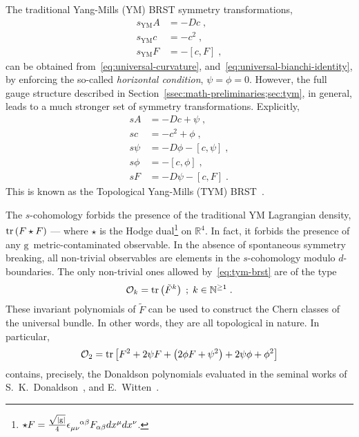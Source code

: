 \documentclass[../main/tex]{subfiles}
\begin{document}
The traditional Yang-Mills (YM) BRST symmetry transformations,
\begin{subequations}\label{eq:ym-brst}
  \begin{align}
    s_{\text{YM}}A & = -Dc \;,                   \\
    s_{\text{YM}}c & = - c^2 \;,                 \\
    s_{\text{YM}}F & = - \left[ c, F \right] \;,
  \end{align}
\end{subequations}
can be obtained from~\eqref{eq:universal-curvature}, and~\eqref{eq:universal-bianchi-identity}, by enforcing the so-called \emph{horizontal condition}, $\psi=\phi=0$. However, the full gauge structure described in Section~\ref{ssec:math-preliminaries;sec:tym}, in general, leads to a much stronger set of symmetry transformations. Explicitly,
\begin{subequations}\label{eq:tym-brst}
  \begin{align}
    sA    & = -Dc + \psi \;,                      \\
    sc    & = - c^2 + \phi \;,                    \\
    s\psi & = -D\phi - \left[ c, \psi \right] \;, \\
    s\phi & = - \left[ c, \phi \right]\;,         \\
    sF    & = -D\psi - \left[ c, F \right] \;.
  \end{align}
\end{subequations}
This is known as the Topological Yang-Mills (TYM) BRST~\cite{baulieu1988a}.

The $ s $-cohomology forbids the presence of the traditional YM Lagrangian density, $ \operatorname{tr} \left( F \star F \right) $ --- where $ \star $ is the Hodge dual\footnote{ $ \star F = \frac{ \sqrt{ |\mathrm{g}| } }{ 4 } \tensor{ \epsilon }{ _{\mu \nu}^{\alpha \beta} } F_{\alpha \beta} dx^\mu dx^\nu $. } on $ \mathbb{R}^4 $. In fact, it forbids the presence of any $ \mathrm{g} $~metric-contaminated observable. In the absence of spontaneous symmetry breaking, all non-trivial observables are elements in the $s$-cohomology modulo $d$-boundaries. The only non-trivial ones allowed by~\eqref{eq:tym-brst} are of the type
\begin{equation}\label{eq:tym-observables}
  \mathcal{O}_k = \operatorname{tr} \left( \tilde{F}^k \right) \; ; \; k \in {\mathbb{N}}^{\ge 1} \;.
\end{equation}
These invariant polynomials of $\tilde{F}$ can be used to construct the Chern classes of the universal bundle. In other words, they are all topological in nature. In particular,
\begin{equation}\label{eq:donaldson-polynomials}
  \mathcal{O}_2 = \operatorname{tr} \left[ F^2 + 2\psi F + \left( 2\phi F + \psi^2 \right) + 2\psi \phi + \phi^2\right]
\end{equation}
contains, precisely, the Donaldson polynomials evaluated in the seminal works of S.~K.~Donaldson~\cite{donaldson1983a,donaldson1990a}, and E.~Witten~\cite{witten1988d}.
\end{document}
